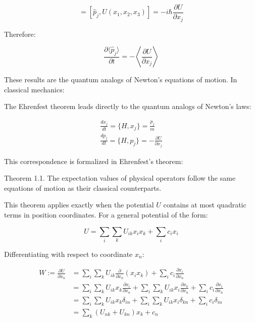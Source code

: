 \documentclass[italian]{HKNdocument}
\begin{document}
\begin{equation}
[\hat{p}_j,U] = [\hat{p}_j,U(x_1,x_2,x_3)] = -i\hbar\frac{\partial U}{\partial x_j} \label{eq:1.92}
\end{equation}

Therefore:

\begin{equation}
\frac{\partial\langle\hat{p}_j\rangle}{\partial t} = -\left\langle\frac{\partial U}{\partial x_j}\right\rangle \label{eq:1.93}
\end{equation}

These results are the quantum analogs of Newton's equations of motion. In classical mechanics:


The Ehrenfest theorem leads directly to the quantum analogs of Newton's laws:

\[
\begin{array}{r}
\frac{dx_j}{dt} = \{H, x_j\} = \frac{p_j}{m} \\
\frac{dp_j}{dt} = \{H, p_j\} = -\frac{\partial U}{\partial x_j} \label{eq:1.94}
\end{array}
\]

This correspondence is formalized in Ehrenfest's theorem:

Theorem 1.1. The expectation values of physical operators follow the same equations of motion as their classical counterparts.

This theorem applies exactly when the potential $U$ contains at most quadratic terms in position coordinates. For a general potential of the form:

\begin{equation}
U = \sum_i \sum_k U_{ik}x_i x_k + \sum_i c_i x_i \label{eq:1.95}
\end{equation}

Differentiating with respect to coordinate $x_n$:

\begin{align}
W := \frac{\partial U}{\partial x_n} &= \sum_i \sum_k U_{ik}\frac{\partial}{\partial x_n}(x_i x_k) + \sum_i c_i \frac{\partial x_i}{\partial x_n} \\
&= \sum_i \sum_k U_{ik}x_k\frac{\partial x_i}{\partial x_n} + \sum_i \sum_k U_{ik}x_i\frac{\partial x_k}{\partial x_n} + \sum_i c_i\frac{\partial x_i}{\partial x_n} \\
&= \sum_i \sum_k U_{ik}x_k\delta_{in} + \sum_i \sum_k U_{ik}x_i\delta_{kn} + \sum_i c_i\delta_{in} \\
&= \sum_k(U_{nk} + U_{kn})x_k + c_n \label{eq:1.96}
\end{align}
\end{document}
